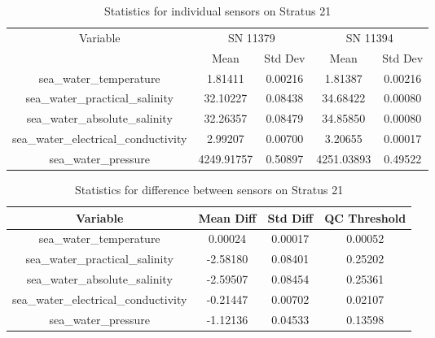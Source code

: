 \begin{table}[h]
\centering
\begin{tabular}{|c|c|c|c|c|}
\hline
Variable & \multicolumn{2}{c|}{SN 11379} & \multicolumn{2}{c|}{SN 11394} \\
& Mean & Std Dev & Mean & Std Dev \\
\hline
sea\_water\_temperature & 1.81411 & 0.00216 & 1.81387 & 0.00216 \\
sea\_water\_practical\_salinity & 32.10227 & 0.08438 & 34.68422 & 0.00080 \\
sea\_water\_absolute\_salinity & 32.26357 & 0.08479 & 34.85850 & 0.00080 \\
sea\_water\_electrical\_conductivity & 2.99207 & 0.00700 & 3.20655 & 0.00017 \\
sea\_water\_pressure & 4249.91757 & 0.50897 & 4251.03893 & 0.49522 \\
\hline
\end{tabular}
\caption{Statistics for individual sensors on Stratus 21}
\end{table}

\begin{table}[h]
\centering
\begin{tabular}{|c|c|c|c|}
\hline
Variable & Mean Diff & Std Diff & QC Threshold \\
\hline
sea\_water\_temperature & 0.00024 & 0.00017 & 0.00052 \\
sea\_water\_practical\_salinity & -2.58180 & 0.08401 & 0.25202 \\
sea\_water\_absolute\_salinity & -2.59507 & 0.08454 & 0.25361 \\
sea\_water\_electrical\_conductivity & -0.21447 & 0.00702 & 0.02107 \\
sea\_water\_pressure & -1.12136 & 0.04533 & 0.13598 \\
\hline
\end{tabular}
\caption{Statistics for difference between sensors on Stratus 21}
\end{table}
